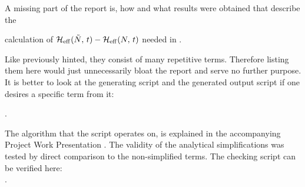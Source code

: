 A missing part of the report is, how and what results were obtained that describe the 

 calculation of $\HeffOft[\tilde{N}]-\HeffOft[N]$ needed in .

Like previously hinted, they consist of many repetitive terms.
Therefore listing them here would just unnecessarily bloat the report and serve no further purpose.
It is better to look at the generating script 
and the generated output script if one desires a specific term from it:

.

The algorithm that the script operates on, is explained in the accompanying Project Work Presentation  \cite{selfDocument}.
The validity of the analytical simplifications was tested by direct comparison to the non-simplified terms.
The checking script can be verified here:\\
.